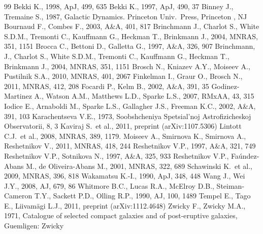 \documentclass[useAMS,usenatbib]{mn2e}
\begin{document}
\begin{thebibliography}{99}
\bibitem[\protect\citeauthoryear{}{}]{}Bekki  K., 1998, ApJ, 499, 635
\bibitem[\protect\citeauthoryear{}{}]{}Bekki  K., 1997, ApJ, 490, 37
\bibitem[\protect\citeauthoryear{}{}]{}Binney J., Tremaine S., 1987, Galactic Dynamics. Princeton Univ.\ Press, Princeton , NJ
\bibitem[\protect\citeauthoryear{}{}]{}Bournaud F., Combes F., 2003, A\&A, 401, 817
\bibitem[\protect\citeauthoryear{}{}]{}Brinchmann J., Charlot S., White S.D.M., Tremonti C., Kauffmann G., Heckman T., Brinkmann J., 2004, MNRAS, 351, 1151
\bibitem[\protect\citeauthoryear{}{}]{}Brocca C., Bettoni D., Galletta G., 1997, A\&A, 326, 907
\bibitem[\protect\citeauthoryear{}{}]{}Brinchmann, J., Charlot S., White S.D.M., Tremonti C., Kauffmann G., Heckman T., Brinkmann J., 2004, MNRAS, 351, 1151
\bibitem[\protect\citeauthoryear{}{}]{}Brosch N., Kniazev A.Y., Moiseev A., Pustilnik S.A., 2010, MNRAS, 401, 2067
\bibitem[\protect\citeauthoryear{}{}]{}Finkelman I., Graur O., Brosch N., 2011, MNRAS, 412, 208
\bibitem[\protect\citeauthoryear{}{}]{}Focardi P., Kelm B., 2002, A\&A, 391, 35
\bibitem[\protect\citeauthoryear{}{}]{}Godinez-Martinez A., Watson A.M., Matthews L.D., Sparke L.S., 2007, RMxAA, 43, 315
\bibitem[\protect\citeauthoryear{}{}]{}Iodice E., Arnaboldi M., Sparke L.S., Gallagher J.S., Freeman K.C., 2002, A\&A, 391, 103
\bibitem[\protect\citeauthoryear{}{}]{}Karachentseva V.E., 1973, Soobshcheniya Spetsial’noj Astrofizicheskoj Observatorii, 8, 3
\bibitem[\protect\citeauthoryear{}{}]{}Kaviraj S.\ et al., 2011, preprint (arXiv:1107.5306)
\bibitem[\protect\citeauthoryear{}{}]{}Lintott C.J.\ et al., 2008, MNRAS, 389, 1179.
\bibitem[\protect\citeauthoryear{}{}]{}Moiseev A., Smirnova K., Smirnova A., Reshetnikov V., 2011, MNRAS, 418, 244
\bibitem[\protect\citeauthoryear{}{}]{}Reshetnikov V.P., 1997, A\&A, 321, 749
\bibitem[\protect\citeauthoryear{}{}]{}Reshetnikov V.P., Sotnikova N., 1997, A\&A, 325, 933
\bibitem[\protect\citeauthoryear{}{}]{}Reshetnikov V.P., Fa\'{u}ndez-Abans M., de Oliveira-Abans M., 2001, MNRAS, 322, 689
\bibitem[\protect\citeauthoryear{}{}]{}Schawinski K.\ et al., 2009, MNRAS, 396, 818
\bibitem[\protect\citeauthoryear{}{}]{}Wakamatsu K.-I., 1990, ApJ, 348, 448
\bibitem[\protect\citeauthoryear{}{}]{}Wang J., Wei J.Y., 2008, AJ, 679, 86
 Whitmore B.C., Lucas R.A., McElroy D.B., Steiman-Cameron T.Y., Sackett P.D., Olling R.P., 1990, AJ, 100, 1489
\bibitem[\protect\citeauthoryear{}{}]{}Tempel E., Tago E., Liivam\"{a}gi L.J., 2011, preprint (arXiv:1112.4648)
\bibitem[\protect\citeauthoryear{}{}]{}Zwicky F., Zwicky M.A., 1971, Catalogue of selected compact galaxies and of post-eruptive galaxies, Guemligen: Zwicky
\end{thebibliography}
\end{document}
